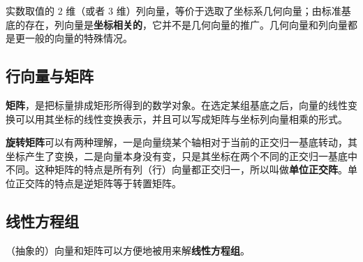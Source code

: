 
实数取值的 $2$ 维（或者 $3$ 维）列向量，等价于选取了坐标系几何向量；由标准基底的存在，列向量是\textbf{坐标相关的}，它并不是几何向量的推广。几何向量和列向量都是更一般的向量的特殊情况。




\subsection{行向量与矩阵}


\textbf{矩阵}，是把标量排成矩形所得到的数学对象。在选定某组基底之后，向量的线性变换可以用其坐标的线性变换表示，并且可以写成矩阵与坐标列向量相乘的形式。


\textbf{旋转矩阵}可以有两种理解，一是向量绕某个轴相对于当前的正交归一基底转动，其坐标产生了变换，二是向量本身没有变，只是其坐标在两个不同的正交归一基底中不同。这种矩阵的特点是所有列（行）向量都正交归一，所以叫做\textbf{单位正交阵}。单位正交阵的特点是逆矩阵等于转置矩阵。






\subsection{线性方程组}

（抽象的）向量和矩阵可以方便地被用来解\textbf{线性方程组}。

